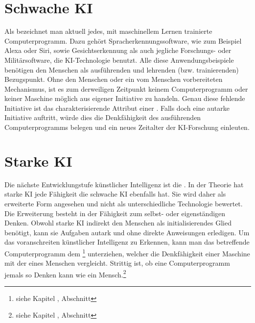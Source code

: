 \documentclass[12pt,german,ngerman]{report}
\begin{document}
    \section{Schwache KI}
        Als  bezeichnet man aktuell jedes,
        mit maschinellem Lernen trainierte Computerprogramm. 
        Dazu gehört Spracherkennungssoftware, wie zum Beispiel Alexa oder Siri,
        sowie Gesichtserkennung als auch jegliche Forschungs- oder Militärsoftware, die KI-Technologie benutzt.
        Alle diese Anwendungsbeispiele benötigen den Menschen als ausführenden und lehrenden (bzw. trainierenden)
        Bezugspunkt.
        Ohne den Menschen oder ein vom Menschen vorbereiteten Mechanismus, ist es zum derweiligen Zeitpunkt
        keinem Computerprogramm oder keiner Maschine möglich aus eigener Initiative zu handeln.
        Genau diese fehlende Initiative ist das charakterisierende Attribut einer .
        Falls doch eine autarke Initiative auftritt, 
        würde dies die Denkfähigkeit des ausführenden Computerprogramms belegen
        und ein neues Zeitalter der KI-Forschung einleuten.

    \newpage

    \section{Starke KI}
        Die nächste Entwicklungstufe künstlicher Intelligenz ist
        die .
        In der Theorie hat starke KI jede Fähigkeit die schwache KI ebenfalls hat.
        Sie wird daher als erweiterte Form angesehen und nicht als unterschiedliche
        Technologie bewertet.
        Die Erweiterung besteht in der Fähigkeit zum selbst- oder eigenständigen Denken. Obwohl
        starke KI indirekt den Menschen als initialisierendes Glied benötigt,
        kann sie Aufgaben autark und ohne direkte Anweisungen erledigen.
        Um das voranschreiten künstlicher Intelligenz zu Erkennen, kann
        man das betreffende Computerprogramm dem 
        \footnote{siehe Kapitel , Abschnitt } unterziehen,
        welcher die Denkfähigkeit einer Maschine mit der eines Menschen vergleicht.
        Strittig ist, ob eine Computerprogramm jemals so Denken kann wie ein 
        Mensch.\footnote{siehe Kapitel , Abschnitt }
\end{document}
